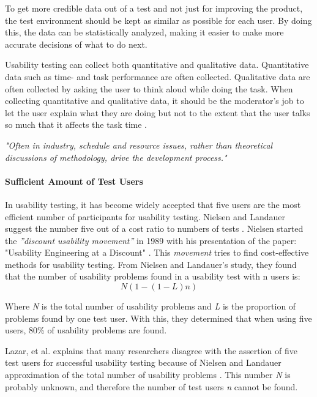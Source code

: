 To get more credible data out of a test and not just for improving the product, the test environment should be kept as similar as possible for each user. By doing this, the data can be statistically analyzed, making it easier to make more accurate decisions of what to do next.

Usability testing can collect both quantitative and qualitative data. Quantitative data such as time- and task performance are often collected. Qualitative data are often collected by asking the user to think aloud while doing the task. When collecting quantitative and qualitative data, it should be the moderator's job to let the user explain what they are doing but not to the extent that the user talks so much that it affects the task time \cite{lazar2017research}.

\textit{"Often in industry, schedule and resource issues, rather than theoretical discussions of methodology, drive the development process."} \cite{wixon2003evaluating}

\paragraph{Sufficient Amount of Test Users}
\label{ssub:Sufficient Amount of Test Users}

In usability testing, it has become widely accepted that five users are the most efficient number of participants for usability testing.  Nielsen and Landauer suggest the number five out of a cost ratio to numbers of tests \cite{nielsen1993mathematical}. Nielsen started the \textit{''discount usability movement''} in 1989 with his presentation of the paper: "Usability Engineering at a Discount" \cite{experienceDiscountUsability20}. This \textit{movement} tries to find cost-effective methods for usability testing. 
From Nielsen and Landauer's study, they found that the number of usability problems found in a usability test with n users is:
\[ N (1-(1- L ) n ) \]

Where \textit{N} is the total number of usability problems and  \textit{L} is the proportion of problems found by one test user. With this, they determined that when using five users, 80\% of usability problems are found.

Lazar, et al. explains that many researchers disagree with the assertion of five test users for successful usability testing because of Nielsen and Landauer approximation of the total number of usability problems \cite[Chapter~10.5.3]{lazar2017research}. This number \textit{N} is probably unknown, and therefore the number of test users \textit{n} cannot be found.

